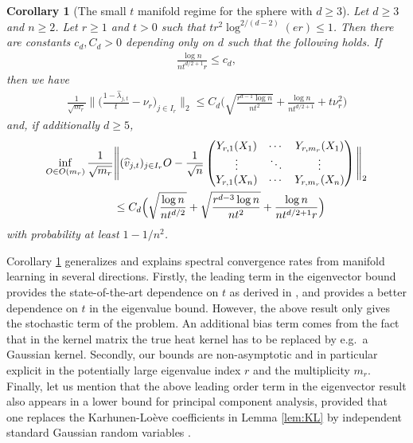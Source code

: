 \documentclass[a4paper,11pt]{article} %
\numberwithin{equation}{section}
\theoremstyle{definition}
\theoremstyle{remark}
\theoremstyle{plain}
\newtheorem{corollary}[definition]{Corollary}
\begin{document}
\begin{corollary}[The small $t$ manifold regime for the sphere with $d\geq 3$]%
    \label{cor_SDsmallTFixedD}
  Let $d \ge 3$ and $n \ge 2$.
  Let $r \ge 1$ and $t > 0$ such that \( t r^{2} \log^{2/(d - 2)}(e r) \le 1 \).  Then there are constants $c_d,C_d >0$ depending only on $d$ such that the following holds. If
  \begin{align}
    \frac{\log n}{nt^{d/2+1}r} \le c_d,
  \end{align}
  then we have
    \begin{align}
          \frac{1}{\sqrt{m_{r}}} 
          \Big\| \Big( \frac{1 - \widehat{\lambda}_{j, t}}{t} - \nu_{r} \Big)_{j \in I_{r}} 
          \Big\|_{2}
    \le 
          C_d          \Big( \sqrt{\frac{r^{d-1}\log n}{nt^2}} 
              + \frac{\log n}{nt^{d/2+1}}
        + 
          t\nu_r^2\Big)
  \end{align}
  and, if additionally $d\geq 5$,
  \begin{align}\label{cor_SDsmallTFixedD:ES}
    \inf_{O \in O(m_r)} 
    \frac{1}{\sqrt{m_r}}&\Bigg\| (\widehat v_{j,t})_{j \in I_r} O- \frac{1}{\sqrt{n}}  \begin{pmatrix}
                                                           Y_{r,1}(X_1) &\cdots &  Y_{r,m_r}(X_1)\\
                                                           \vdots  & \ddots & \vdots    \\
                                                           Y_{r,1}(X_n) &\cdots & Y_{r,m_r}(X_n) 
                                                         \end{pmatrix}
    \Bigg\|_2
    \\
    &\le 
    C_d\Big(\sqrt{\frac{\log n}{nt^{d/2}}}+ \sqrt{\frac{r^{d-3}\log n}{nt^2}}+\frac{\log n}{nt^{d/2+1}r}\Big)\notag
  \end{align}
  with probability at least \( 1 - 1/n^2\).
\end{corollary}%

Corollary \ref{cor_SDsmallTFixedD} generalizes and explains spectral convergence rates from manifold learning in several directions. Firstly, the leading term in the eigenvector bound provides the state-of-the-art dependence on $t$ as derived in \cite{MR4452681,TLV25}, and provides a better dependence on $t$ in the eigenvalue bound. However, the above result only gives the stochastic term of the problem. An additional bias term comes from the fact that in the kernel matrix the true heat kernel has to be replaced by e.g.~a Gaussian kernel. Secondly, our bounds are non-asymptotic and in particular explicit in the potentially large eigenvalue index $r$ and the multiplicity $m_r$. Finally, let us mention that the above leading order term in the eigenvector result also appears in a lower bound for principal component analysis, provided that one replaces the Karhunen-Loève coefficients in Lemma \ref{lem:KL} by independent standard Gaussian random variables \cite{MR4647373}.
\end{document}
